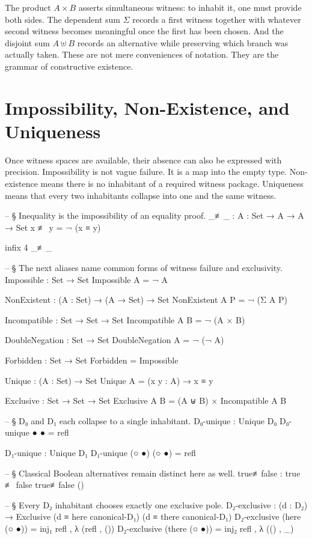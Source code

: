 \documentclass[11pt,a4paper]{book}
\begin{document}
The product $A \times B$ asserts simultaneous witness: to inhabit it, one must provide both sides. The dependent sum $\Sigma$ records a first witness together with whatever second witness becomes meaningful once the first has been chosen. And the disjoint sum $A \uplus B$ records an alternative while preserving which branch was actually taken. These are not mere conveniences of notation. They are the grammar of constructive existence.

\section{Impossibility, Non-Existence, and Uniqueness}

Once witness spaces are available, their absence can also be expressed with precision. Impossibility is not vague failure. It is a map into the empty type. Non-existence means there is no inhabitant of a required witness package. Uniqueness means that every two inhabitants collapse into one and the same witness.

\begin{code}

-- § Inequality is the impossibility of an equality proof.
_≢_ : {A : Set} → A → A → Set
x ≢ y = ¬ (x ≡ y)

infix 4 _≢_

-- § The next aliases name common forms of witness failure and exclusivity.
Impossible : Set → Set
Impossible A = ¬ A

NonExistent : (A : Set) → (A → Set) → Set
NonExistent A P = ¬ (Σ A P)

Incompatible : Set → Set → Set
Incompatible A B = ¬ (A × B)

DoubleNegation : Set → Set
DoubleNegation A = ¬ (¬ A)

Forbidden : Set → Set
Forbidden = Impossible

Unique : (A : Set) → Set
Unique A = (x y : A) → x ≡ y

Exclusive : Set → Set → Set
Exclusive A B = (A ⊎ B) × Incompatible A B

-- § D₀ and D₁ each collapse to a single inhabitant.
D₀-unique : Unique D₀
D₀-unique ● ● = refl

D₁-unique : Unique D₁
D₁-unique (○ ●) (○ ●) = refl

-- § Classical Boolean alternatives remain distinct here as well.
true≢false : true ≢ false
true≢false ()

-- § Every D₂ inhabitant chooses exactly one exclusive pole.
D₂-exclusive : (d : D₂) → Exclusive (d ≡ here canonical-D₁) (d ≡ there canonical-D₁)
D₂-exclusive (here (○ ●)) = inj₁ refl , λ { (refl , ()) }
D₂-exclusive (there (○ ●)) = inj₂ refl , λ { (() , _) }
\end{code}
\end{document}
